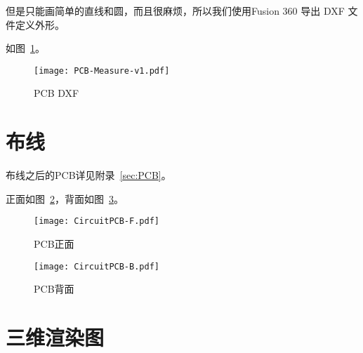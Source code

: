 但是只能画简单的直线和圆，而且很麻烦，所以我们使用Fusion 360 导出 DXF 文件定义外形。

如图~\ref{fig:PCB-Measure-v1}。

\begin{figure}[htbp]
    \centering
    \texttt{[image: PCB-Measure-v1.pdf]}
    \caption{PCB DXF}
    \label{fig:PCB-Measure-v1}
\end{figure}


\section{布线}







布线之后的PCB详见附录~\ref{sec:PCB}。

正面如图~\ref{fig:CircuitPCB-F}，背面如图~\ref{fig:CircuitPCB-B}。

\begin{figure}[htbp]
    \centering
    \texttt{[image: CircuitPCB-F.pdf]}
    \caption{PCB正面}
    \label{fig:CircuitPCB-F}
\end{figure}

\begin{figure}[htbp]
    \centering
    \texttt{[image: CircuitPCB-B.pdf]}
    \caption{PCB背面}
    \label{fig:CircuitPCB-B}
\end{figure}

\section{三维渲染图}

